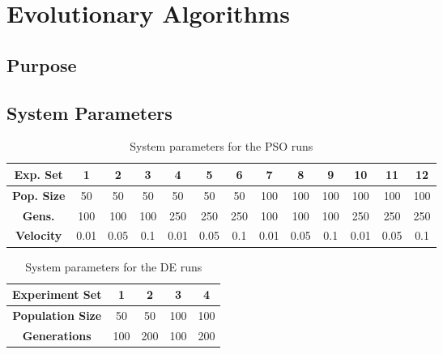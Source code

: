 \section{Evolutionary Algorithms}

\subsection{Purpose}




\subsection{System Parameters}

\begin{table}
	\centering
	\begin{tabular}{ | >{\bfseries}c | c | c | c | c | c | c | c | c | c | c | c | c | }
		\hline
		Exp. Set & 1 & 2 & 3 & 4 & 5 & 6 & 7 & 8 & 9 & 10 & 11 & 12 \\ \hline
		Pop. Size & 50 & 50 & 50 & 50 & 50 & 50 & 100 & 100 & 100 & 100 & 100 & 100 \\ \hline
		Gens. & 100 & 100 & 100 & 250 & 250 & 250 & 100 & 100 & 100 & 250 & 250 & 250 \\ \hline
		Velocity & 0.01 & 0.05 & 0.1 & 0.01 & 0.05 & 0.1 & 0.01 & 0.05 & 0.1 & 0.01 & 0.05 & 0.1 \\ \hline
	\end{tabular}
	\caption{System parameters for the PSO runs}
	\label{table:ea-pso}
\end{table}

\begin{table}
	\centering
	\begin{tabular}{ | >{\bfseries}c | c | c | c | c | }
		\hline
		Experiment Set & 1 & 2 & 3 & 4 \\ \hline
		Population Size & 50 & 50 & 100 & 100 \\ \hline
		Generations & 100 & 200 & 100 & 200 \\ \hline
	\end{tabular}
	\caption{System parameters for the DE runs}
	\label{table:ea-de}
\end{table}

